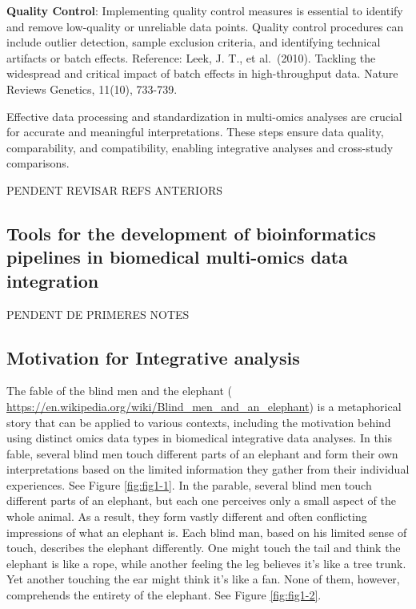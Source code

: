 \documentclass[a4paper, nobind]{templates/ociamthesis}
\begin{document}
\textbf{Quality Control}: Implementing quality control measures is essential to identify and remove low-quality or unreliable data points. Quality control procedures can include outlier detection, sample exclusion criteria, and identifying technical artifacts or batch effects. Reference: Leek, J. T., et al.~(2010). Tackling the widespread and critical impact of batch effects in high-throughput data. Nature Reviews Genetics, 11(10), 733-739.

Effective data processing and standardization in multi-omics analyses are crucial for accurate and meaningful interpretations. These steps ensure data quality, comparability, and compatibility, enabling integrative analyses and cross-study comparisons.

PENDENT REVISAR REFS ANTERIORS

\hypertarget{tools-for-the-development-of-bioinformatics-pipelines-in-biomedical-multi-omics-data-integration}{%
\subsection{Tools for the development of bioinformatics pipelines in biomedical multi-omics data integration}\label{tools-for-the-development-of-bioinformatics-pipelines-in-biomedical-multi-omics-data-integration}}

PENDENT DE PRIMERES NOTES

\hypertarget{motivation-for-integrative-analysis}{%
\subsection{Motivation for Integrative analysis}\label{motivation-for-integrative-analysis}}

The fable of the blind men and the elephant ( \url{https://en.wikipedia.org/wiki/Blind_men_and_an_elephant}) is a metaphorical story that can be applied to various contexts, including the motivation behind using distinct omics data types in biomedical integrative data analyses. In this fable, several blind men touch different parts of an elephant and form their own interpretations based on the limited information they gather from their individual experiences. See Figure \ref{fig:fig1-1}. In the parable, several blind men touch different parts of an elephant, but each one perceives only a small aspect of the whole animal. As a result, they form vastly different and often conflicting impressions of what an elephant is. Each blind man, based on his limited sense of touch, describes the elephant differently. One might touch the tail and think the elephant is like a rope, while another feeling the leg believes it's like a tree trunk. Yet another touching the ear might think it's like a fan. None of them, however, comprehends the entirety of the elephant. See Figure \ref{fig:fig1-2}.
\end{document}

